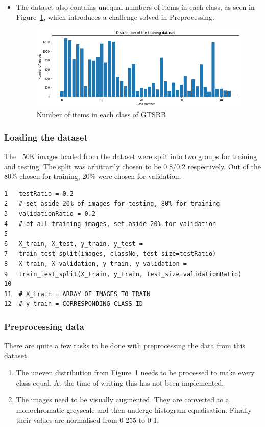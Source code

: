 \documentclass[12pt, landscape, margin=2cm]{article}
\begin{document}
\begin{multicols}{3}
\begin{itemize}
    \item The dataset also contains unequal numbers of items in each class, as
    seen in Figure~\ref{fig:figure}, which introduces a challenge solved in
    Preprocessing.
    \begin{figure}[H]
        \centerline{\includegraphics[scale = 0.5]{download.png}}
        \caption{Number of items in each class of GTSRB}
        \label{fig:figure}
    \end{figure}

  \end{itemize}

\subsubsection{Loading the dataset}
The ~50K images loaded from the dataset were split into two groups for training
and testing. The split was arbitrarily chosen to be 0.8/0.2 respectively. Out of
the 80\% chosen for training, 20\% were chosen for validation.

\color{red}
\begin{Verbatim}[fontsize=\small]
1   testRatio = 0.2 
2   # set aside 20% of images for testing, 80% for training
3   validationRatio = 0.2 
4   # of all training images, set aside 20% for validation
5
6   X_train, X_test, y_train, y_test = 
7   train_test_split(images, classNo, test_size=testRatio)
8   X_train, X_validation, y_train, y_validation = 
9   train_test_split(X_train, y_train, test_size=validationRatio)
10 
11  # X_train = ARRAY OF IMAGES TO TRAIN
12  # y_train = CORRESPONDING CLASS ID
\end{Verbatim}
\color{black}

\subsubsection{Preprocessing data}
There are quite a few tasks to be done with preprocessing the data from this
dataset. 
\begin{enumerate}
    \item
    The uneven distribution from Figure~\ref{fig:figure} needs to be
    processed to make every class equal.
    At the time of writing this has not been implemented.
    \item The images need to be visually augmented. They are converted to a
    monochromatic greyscale and then undergo histogram equalisation. Finally
    their values are normalised from 0-255 to 0-1.
\end{enumerate}


\end{multicols}
\end{document}
